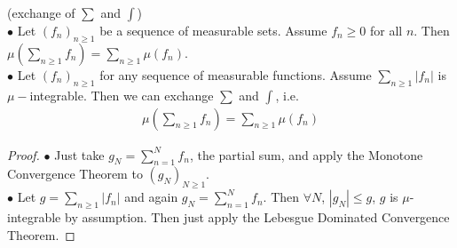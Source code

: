 \documentclass[a4paper]{article}
\begin{document}
\begin{coro} (exchange of $\sum$ and $\int$)\\
$\bullet$ Let $(f_n)_{n \geq 1}$ be a sequence of measurable sets. Assume $f_n \geq 0$ for all $n$. Then $\mu(\sum_{n \geq 1} f_n) = \sum_{n \geq 1} \mu(f_n)$. \\
$\bullet$ Let $(f_n)_{n \geq 1}$ for any sequence of measurable functions. Assume $\sum_{n \geq 1} |f_n|$ is $\mu-$integrable. Then we can exchange $\sum$ and $\int$, i.e.
\begin{equation*}
\begin{aligned}
\mu(\sum_{n \geq 1} f_n) = \sum_{n \geq 1} \mu (f_n)
\end{aligned}
\end{equation*}
\begin{proof}
$\bullet$ Just take $g_N = \sum_{n=1}^N f_n$, the partial sum, and apply the Monotone Convergence Theorem to $(g_N)_{N \geq 1}$. \\
$\bullet$ Let $g=\sum_{n \geq 1} |f_n|$ and again $g_N = \sum_{n=1}^N f_n$. Then $\forall N$, $|g_N| \leq g$, $g$ is $\mu$-integrable by assumption. Then just apply the Lebesgue Dominated Convergence Theorem.
\end{proof}
\end{coro}
\end{document}
